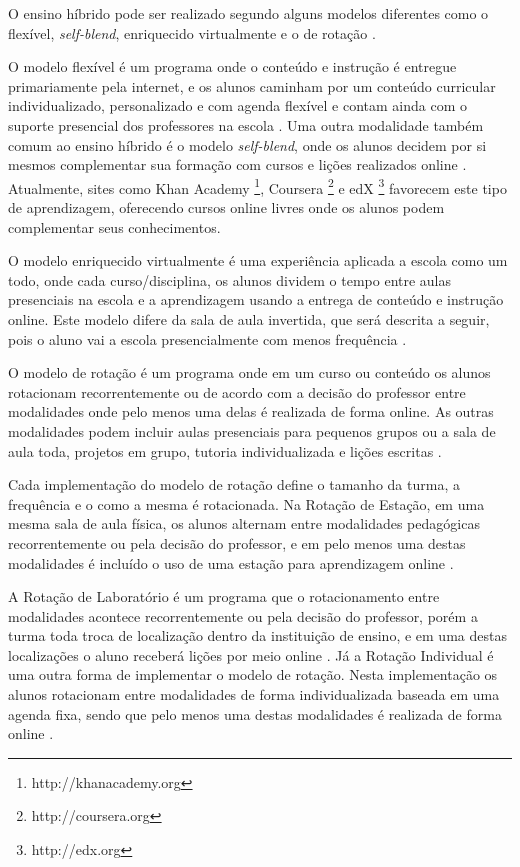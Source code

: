 O ensino híbrido pode ser realizado segundo alguns modelos diferentes como o flexível, \emph{self-blend}, enriquecido virtualmente e o de rotação \cite{staker_classifying_2012}.

O modelo flexível é um programa onde o conteúdo e instrução é entregue primariamente pela internet, e os alunos caminham por um conteúdo curricular individualizado, personalizado e com agenda flexível e contam ainda com o suporte presencial dos professores na escola \cite{staker_classifying_2012}. Uma outra modalidade também comum ao ensino híbrido é o modelo \emph{self-blend}, onde os alunos decidem por si mesmos complementar sua formação com cursos e lições realizados online \cite{horn_rise_2011}. Atualmente, sites como Khan Academy \footnote{http://khanacademy.org}, Coursera \footnote{http://coursera.org} e edX \footnote{http://edx.org} favorecem este tipo de aprendizagem, oferecendo cursos online livres onde os alunos podem complementar seus conhecimentos.

O modelo enriquecido virtualmente é uma experiência aplicada a escola como um todo, onde cada curso/disciplina, os alunos dividem o tempo entre aulas presenciais na escola e a aprendizagem usando a entrega de conteúdo e instrução online. Este modelo difere da sala de aula invertida, que será descrita a seguir, pois o aluno vai a escola presencialmente com menos frequência \cite{staker_classifying_2012}.

O modelo de rotação é um programa onde em um curso ou conteúdo os alunos rotacionam recorrentemente ou de acordo com a decisão do professor entre modalidades onde pelo menos uma delas é realizada de forma online. As outras modalidades podem incluir aulas presenciais para pequenos grupos ou a sala de aula toda, projetos em grupo, tutoria individualizada e lições escritas \cite{staker_classifying_2012}.

Cada implementação do modelo de rotação define o tamanho da turma, a frequência e o como a mesma é rotacionada. Na Rotação de Estação, em uma mesma sala de aula física, os alunos alternam entre modalidades pedagógicas recorrentemente ou pela decisão do professor, e em pelo menos uma destas modalidades é incluído o uso de uma estação para aprendizagem online \cite{staker_classifying_2012}.

A Rotação de Laboratório é um programa que o rotacionamento entre modalidades acontece recorrentemente ou pela decisão do professor, porém a turma toda troca de localização dentro da instituição de ensino, e em uma destas localizações o aluno receberá lições por meio online \cite{staker_classifying_2012}. Já a Rotação Individual é uma outra forma de implementar o modelo de rotação. Nesta implementação os alunos rotacionam entre modalidades de forma individualizada baseada em uma agenda fixa, sendo que pelo menos uma destas modalidades é realizada de forma online \cite{staker_classifying_2012}.

